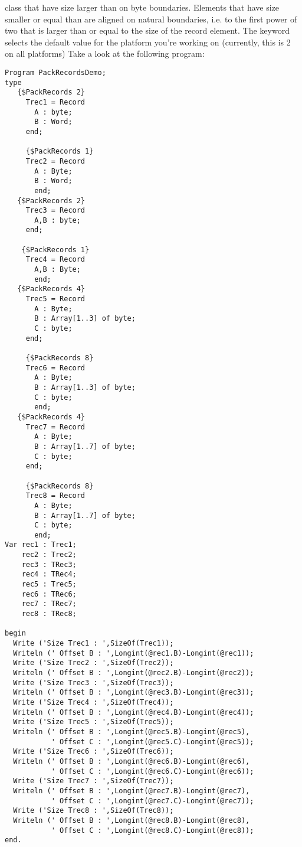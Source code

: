 \documentclass{report}
\begin{document}
class that have size larger than  on  byte boundaries.
Elements that have size smaller or equal than  are aligned on
natural boundaries, i.e. to the first power of two that is larger than or
equal to the size of the record element.
The keyword  selects the default value for the platform
you're working on (currently, this is 2 on all platforms)
Take a look at the following program:
\begin{verbatim}
Program PackRecordsDemo;
type
   {$PackRecords 2}
     Trec1 = Record
       A : byte;
       B : Word;
     end;

     {$PackRecords 1}
     Trec2 = Record
       A : Byte;
       B : Word;
       end;
   {$PackRecords 2}
     Trec3 = Record
       A,B : byte;
     end;

    {$PackRecords 1}
     Trec4 = Record
       A,B : Byte;
       end;
   {$PackRecords 4}
     Trec5 = Record
       A : Byte;
       B : Array[1..3] of byte;
       C : byte;
     end;

     {$PackRecords 8}
     Trec6 = Record
       A : Byte;
       B : Array[1..3] of byte;
       C : byte;
       end;
   {$PackRecords 4}
     Trec7 = Record
       A : Byte;
       B : Array[1..7] of byte;
       C : byte;
     end;

     {$PackRecords 8}
     Trec8 = Record
       A : Byte;
       B : Array[1..7] of byte;
       C : byte;
       end;
Var rec1 : Trec1;
    rec2 : Trec2;
    rec3 : TRec3;
    rec4 : TRec4;
    rec5 : Trec5;
    rec6 : TRec6;
    rec7 : TRec7;
    rec8 : TRec8;

begin
  Write ('Size Trec1 : ',SizeOf(Trec1));
  Writeln (' Offset B : ',Longint(@rec1.B)-Longint(@rec1));
  Write ('Size Trec2 : ',SizeOf(Trec2));
  Writeln (' Offset B : ',Longint(@rec2.B)-Longint(@rec2));
  Write ('Size Trec3 : ',SizeOf(Trec3));
  Writeln (' Offset B : ',Longint(@rec3.B)-Longint(@rec3));
  Write ('Size Trec4 : ',SizeOf(Trec4));
  Writeln (' Offset B : ',Longint(@rec4.B)-Longint(@rec4));
  Write ('Size Trec5 : ',SizeOf(Trec5));
  Writeln (' Offset B : ',Longint(@rec5.B)-Longint(@rec5),
           ' Offset C : ',Longint(@rec5.C)-Longint(@rec5));
  Write ('Size Trec6 : ',SizeOf(Trec6));
  Writeln (' Offset B : ',Longint(@rec6.B)-Longint(@rec6),
           ' Offset C : ',Longint(@rec6.C)-Longint(@rec6));
  Write ('Size Trec7 : ',SizeOf(Trec7));
  Writeln (' Offset B : ',Longint(@rec7.B)-Longint(@rec7),
           ' Offset C : ',Longint(@rec7.C)-Longint(@rec7));
  Write ('Size Trec8 : ',SizeOf(Trec8));
  Writeln (' Offset B : ',Longint(@rec8.B)-Longint(@rec8),
           ' Offset C : ',Longint(@rec8.C)-Longint(@rec8));
end.
\end{verbatim}
\end{document}
